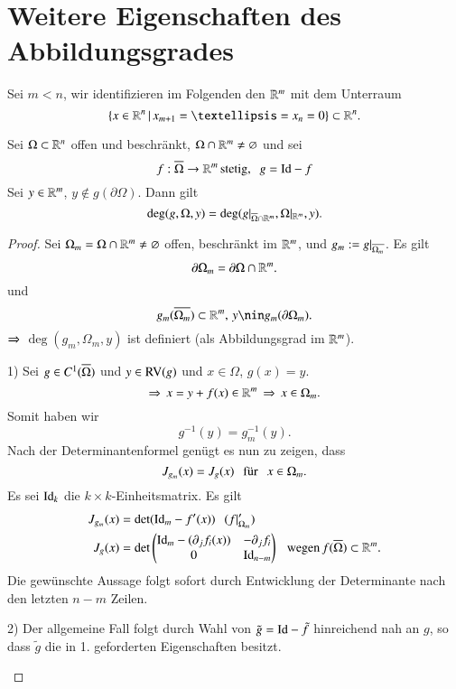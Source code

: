 \section{Weitere Eigenschaften des Abbildungsgrades}

Sei $m<n$, wir identifizieren im Folgenden den $\mathbb{R}^m$ mit dem Unterraum
\[
    \{x\in \R^n \, | \, x_{m+1}=…=x_n=0\}\subset \R^n.
\]

\begin{theorem}\label{2.14}
    Sei $\Omega \subset \mathbb{R}^n$ offen und beschränkt, $\Omega \cap \mathbb{R}^m \neq \varnothing$ und sei
    \[
        f:\overline \Omega \rightarrow \mathbb{R}^m\, \text{stetig,} \hspace{.25cm} g=\mathrm{Id}-f
    \]
    Sei $y\in \mathbb{R}^m$, $y\nin g(\partial \Omega)$. Dann gilt
    \[
        \deg(g,\Omega,y)=\deg(g|_{\overline{\Omega}\cap\mathbb{R}^m},\Omega|_{\mathbb{R}^m},y).
    \]
\end{theorem}

\begin{proof}
    Sei $\Omega_m=\Omega\cap\mathbb{R}^m\neq \varnothing$ offen, beschränkt im $\mathbb{R}^m$, und
    $g_m:=g|_{\overline{\Omega_m}}$. Es gilt
    \[
        \partial \Omega_m=\partial\Omega\cap\mathbb{R}^m.
    \]
    und
    \[
        g_m(\ol{\Omega_m})\subset\R^m,\, y\nin g_m(\partial\Omega_m).
    \]
    $\Rightarrow$ $\deg(g_m,\Omega_m,y)$ ist definiert (als Abbildungsgrad im $\mathbb{R}^m$).
    \begin{description}
        \item{1)}
        Sei $g\in C^1(\overline \Omega)$ und $y\in \mathrm{RV}(g)$ und $x\in \Omega$, $g(x)=y$.
        \[
            \Rightarrow \, x=y+f(x)\in \mathbb{R}^m \, \Rightarrow \, x\in \Omega_m.
        \]
        Somit haben wir
        \[
            g^{-1}(y)=g_m^{-1}(y).
        \]
        Nach der Determinantenformel genügt es nun zu zeigen, dass
        \[
            J_{g_m}(x)=J_g(x) \hspace{.25cm} \text{für} \hspace{.25cm} x\in \Omega_m.
        \]
        Es sei $\mathrm{Id}_k$ die $k\times k$-Einheitsmatrix. Es gilt
        \begin{align*}
            J_{g_m}(x)&=\det(\mathrm{Id}_m-f'(x)) \hspace{.25cm} (f|_{\Omega_m}')\\
            J_g(x)&= \det\begin{pmatrix} \mathrm{Id}_m-(\partial_jf_i(x)) & -\partial_jf_i\\
            0& \mathrm{Id}_{n-m}\end{pmatrix} \hspace{.25cm} \text{wegen} \, f(\overline\Omega)\subset\mathbb{R}^m.
        \end{align*}
        Die gewünschte Aussage folgt sofort durch Entwicklung der Determinante nach den letzten
        $n-m$ Zeilen.
        \item{2)}
        Der allgemeine Fall folgt durch Wahl von $\tilde g=\mathrm{Id}-\tilde f$ hinreichend nah an $g$, so dass
        $\tilde g$ die in 1. geforderten Eigenschaften besitzt.
    \end{description}
    \[ \]
\end{proof}
